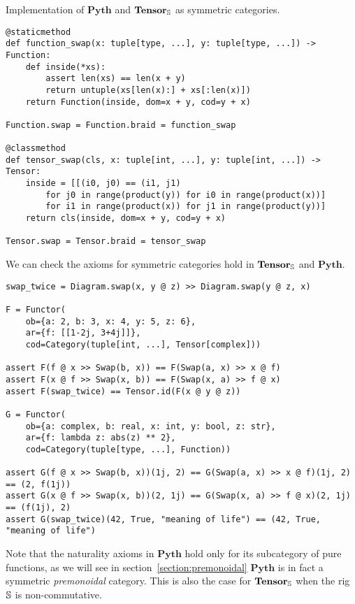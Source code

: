 \begin{python}
{\normalfont Implementation of $\mathbf{Pyth}$ and $\mathbf{Tensor}_\S$ as symmetric categories.}

\begin{verbatim}
@staticmethod
def function_swap(x: tuple[type, ...], y: tuple[type, ...]) -> Function:
    def inside(*xs):
        assert len(xs) == len(x + y)
        return untuple(xs[len(x):] + xs[:len(x)])
    return Function(inside, dom=x + y, cod=y + x)

Function.swap = Function.braid = function_swap

@classmethod
def tensor_swap(cls, x: tuple[int, ...], y: tuple[int, ...]) -> Tensor:
    inside = [[(i0, j0) == (i1, j1)
        for j0 in range(product(y)) for i0 in range(product(x))]
        for i1 in range(product(x)) for j1 in range(product(y))]
    return cls(inside, dom=x + y, cod=y + x)

Tensor.swap = Tensor.braid = tensor_swap
\end{verbatim}
\end{python}

\begin{example}
We can check the axioms for symmetric categories hold in $\mathbf{Tensor}_\S$ and $\mathbf{Pyth}$.

\begin{verbatim}
swap_twice = Diagram.swap(x, y @ z) >> Diagram.swap(y @ z, x)

F = Functor(
    ob={a: 2, b: 3, x: 4, y: 5, z: 6},
    ar={f: [[1-2j, 3+4j]]},
    cod=Category(tuple[int, ...], Tensor[complex]))

assert F(f @ x >> Swap(b, x)) == F(Swap(a, x) >> x @ f)
assert F(x @ f >> Swap(x, b)) == F(Swap(x, a) >> f @ x)
assert F(swap_twice) == Tensor.id(F(x @ y @ z))

G = Functor(
    ob={a: complex, b: real, x: int, y: bool, z: str},
    ar={f: lambda z: abs(z) ** 2},
    cod=Category(tuple[type, ...], Function))

assert G(f @ x >> Swap(b, x))(1j, 2) == G(Swap(a, x) >> x @ f)(1j, 2) == (2, f(1j))
assert G(x @ f >> Swap(x, b))(2, 1j) == G(Swap(x, a) >> f @ x)(2, 1j) == (f(1j), 2)
assert G(swap_twice)(42, True, "meaning of life") == (42, True, "meaning of life")
\end{verbatim}
\end{example}

\begin{remark}
Note that the naturality axioms in $\mathbf{Pyth}$ hold only for its subcategory of pure functions, as we will see in section~\ref{section:premonoidal} $\mathbf{Pyth}$ is in fact a symmetric \emph{premonoidal} category.
This is also the case for $\mathbf{Tensor}_\S$ when the rig $\S$ is non-commutative.
\end{remark}

